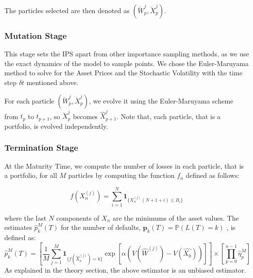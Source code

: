 The particles selected are then denoted as $(\breve{W}_p^{j},\breve{X}_p^{j})$.

\subsubsection{Mutation Stage}
This stage sets the IPS apart from other importance sampling methods, as we use 
the exact dynamics of the model to sample points. We chose the Euler-Maruyama 
method to solve for the Asset Prices and the Stochastic Volatility with the 
time step $\delta t$ mentioned above.

For each particle $(\breve{W}_p^{j},\breve{X}_p^{j})$, we evolve it using the 
Euler-Maruyama scheme from $t_p$ to $t_{p+1}$, so $\breve{X}_p^{j}$ becomes $\hat{X}_{p+1}^{j}$.
Note that, each particle, that is a portfolio, is evolved independently.

\subsubsection{Termination Stage}
At the Maturity Time, we compute the number of losses in each particle, 
that is a portfolio, for all $M$ particles by computing the function $f_n$ 
defined as follows:

\begin{equation}
	f(X^{(j)}_n) = \sum_{i=1}^{N}\mathbf{1}_{\lbrace X^{(j)}_{n}(N + 1 + i)\leq B_{i}\rbrace}
\end{equation}

where the last $N$ components of $X_n$ are the minimums of the asset values. 
The estimates $\hat{p}_k^M(T)$ for the number of defaults, $\mathbf{p}_k(T) = \mathbb{P}(L(T)=k)$
, is defined as:
\begin{equation}
	\hat{p}_{k}^{M}(T) = \left[ \frac{1}{M} \sum_{j=1}^{M} \mathbf{1}_{\lbrace 
			f(\hat{X}_{n}^{(j)}) = k \rbrace } \exp \left[ \alpha \left( V(\hat{W}^{(j)}) -
		V(\hat{X_{0}}) \right) \right] \right] \times \left[ \prod_{p=0}^{n-1} 
			\hat{\eta}_{p}^{M} \right]
		\end{equation}
		As explained in the theory section, the above estimator is an unbiased estimator.
